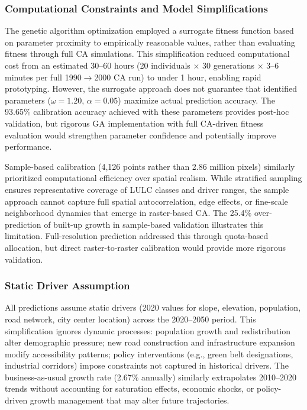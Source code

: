 \documentclass[conference]{IEEEtran}
\begin{document}
\subsubsection{Computational Constraints and Model Simplifications}

The genetic algorithm optimization employed a surrogate fitness function based on parameter proximity to empirically reasonable values, rather than evaluating fitness through full CA simulations. This simplification reduced computational cost from an estimated 30--60 hours (20 individuals $\times$ 30 generations $\times$ 3--6 minutes per full 1990$\rightarrow$2000 CA run) to under 1 hour, enabling rapid prototyping. However, the surrogate approach does not guarantee that identified parameters ($\omega=1.20$, $\alpha=0.05$) maximize actual prediction accuracy. The 93.65\% calibration accuracy achieved with these parameters provides post-hoc validation, but rigorous GA implementation with full CA-driven fitness evaluation would strengthen parameter confidence and potentially improve performance.

Sample-based calibration (4,126 points rather than 2.86 million pixels) similarly prioritized computational efficiency over spatial realism. While stratified sampling ensures representative coverage of LULC classes and driver ranges, the sample approach cannot capture full spatial autocorrelation, edge effects, or fine-scale neighborhood dynamics that emerge in raster-based CA. The 25.4\% over-prediction of built-up growth in sample-based validation illustrates this limitation. Full-resolution prediction addressed this through quota-based allocation, but direct raster-to-raster calibration would provide more rigorous validation.

\subsubsection{Static Driver Assumption}

All predictions assume static drivers (2020 values for slope, elevation, population, road network, city center location) across the 2020--2050 period. This simplification ignores dynamic processes: population growth and redistribution alter demographic pressure; new road construction and infrastructure expansion modify accessibility patterns; policy interventions (e.g., green belt designations, industrial corridors) impose constraints not captured in historical drivers. The business-as-usual growth rate (2.67\% annually) similarly extrapolates 2010--2020 trends without accounting for saturation effects, economic shocks, or policy-driven growth management that may alter future trajectories.
\end{document}
